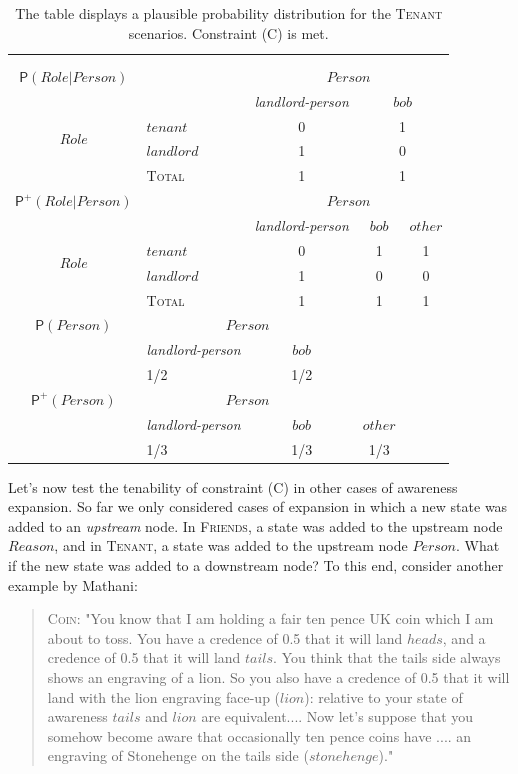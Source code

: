 \documentclass[
  11pt,
  dvipsnames,enabledeprecatedfontcommands, todos]{scrartcl}
\newcommand{\pr}[1]{\ensuremath{\mathsf{P}(#1)}}
\newcommand{\ppr}[2]{\ensuremath{\mathsf{P}^{#1}(#2)}}
\begin{document}
\begin{table}[h]
\begin{tabular}{clccc}
&&&&\\
&&&&\\
$\pr{Role \vert Person}$ & & \multicolumn{3}{c}{$Person$} \\
 &   & \textit{landlord-person}  & \multicolumn{2}{c}{$bob$} \\
\multirow{2}{*}{$Role$} & $tenant$ & 0 & \multicolumn{2}{c}{1}\\
& $landlord$  & 1 & \multicolumn{2}{c}{0} \\
\hline
& \textsc{Total} & 1 & \multicolumn{2}{c}{1}  \\
\hline
\hline
$\ppr{+}{Role \vert Person}$ & & \multicolumn{3}{c}{$Person$} \\
&  & \textit{landlord-person} & $bob$ & $other$ \\
\multirow{2}{*}{$Role$} & $tenant$ & 0 & 1 & 1\\ 
& $landlord$ & 1 & 0 & 0 \\
\hline
& \textsc{Total} & 1 & 1 & 1  \\
\hline
\hline
$\pr{Person}$ & \multicolumn{2}{c}{$Person$} & \\
&  \textit{landlord-person} & $bob$ & \\
& 1/2 & 1/2 & \\
\hline
\hline
$\ppr{+}{Person}$ & \multicolumn{2}{c}{$Person$} & \\
&  \textit{landlord-person} & $bob$ & $other$ \\
& 1/3 & 1/3 & 1/3 \\
\end{tabular}
\caption{The table displays a plausible probability distribution for the \textsc{Tenant} scenarios. Constraint (C) is met.}
\label{table:tenant}
\end{table}

Let's now test the tenability of constraint (C) in other cases of
awareness expansion. So far we only considered cases of expansion in
which a new state was added to an \emph{upstream} node. In
\textsc{Friends}, a state was added to the upstream node \(Reason\), and
in \textsc{Tenant}, a state was added to the upstream node \(Person\).
What if the new state was added to a downstream node? To this end,
consider another example by Mathani:

\begin{quote} 
\textsc{Coin}: "You know that I am holding a fair ten pence UK coin which I am about to toss. You
have a credence of 0.5 that it will land $heads$, and a credence of 0.5 that it will
land $tails$. You think that the tails side always shows an engraving of a lion. So you
also  have a credence of 0.5 that it will land with the lion engraving face-up ($lion$): relative to your state of awareness $tails$ and $lion$ are equivalent.... Now let's suppose that you somehow become aware that occasionally ten pence coins have .... an engraving of Stonehenge on the tails side ($stonehenge$)." 
\end{quote}
\end{document}

